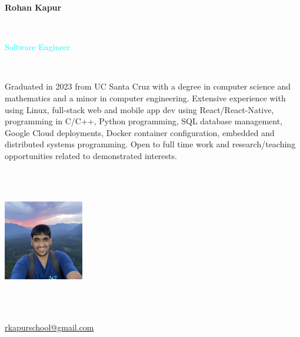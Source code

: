 \documentclass[letterpaper,10pt]{article}
\begin{document}
\fontsize{9pt}{\baselineskip}\selectfont

\begin{multicols}{3}
  \begin{huge} \noindent\textbf{Rohan Kapur} \end{huge} \\
  \begin{Large} \textcolor{cyan}{Software Engineer} \end{Large} 
  \vspace{.5em} \\
  \begin{minipage}{.5\textwidth}
    \begin{flushleft}
      Graduated in 2023 from UC Santa Cruz with a degree in computer science and mathematics and a minor in computer engineering. Extensive experience with using Linux, full-stack web and mobile app dev using React/React-Native, programming in C/C++, Python programming, SQL database management, Google Cloud deployments, Docker container configuration, embedded and distributed systems programming. Open to full time work and research/teaching opportunities related to demonstrated interests.
    \end{flushleft}
  \end{minipage}
  \columnbreak \\
  \vspace{3em} \\
  \begin{minipage}{.33\textwidth}
    \hspace{11.6em}
    \includegraphics*[width=3.5cm,height=3.5cm]{images/ProfilePicture.jpg}
  \end{minipage}
  \columnbreak \\
  \vspace{3em} \\
  \begin{minipage}{.33\textwidth}
    \begin{flushright}
      \faEnvelope\hspace{4px}\href{mailto:rkapurschool@gmail.com}{rkapurschool@gmail.com} \\

\end{flushright}
\end{minipage}
\end{multicols}
\end{document}
